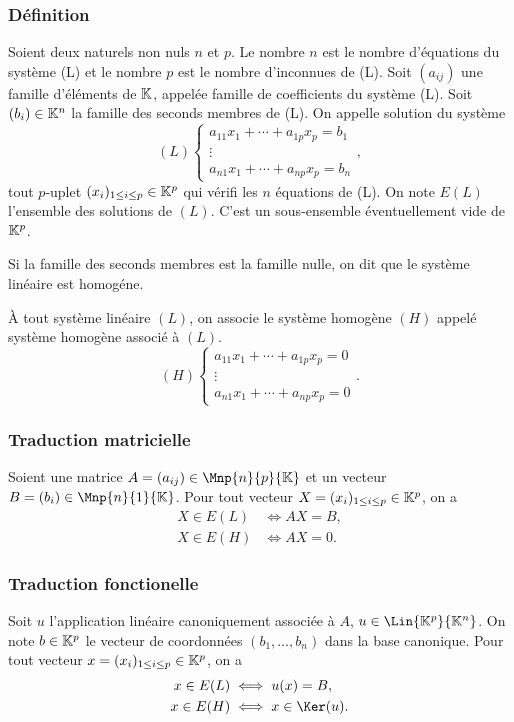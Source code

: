 \subsubsection{Définition}
\begin{defdef}
  Soient deux naturels non nuls $n$ et $p$. Le nombre $n$ est le nombre d'équations du système (L) et le nombre $p$ est le nombre d'inconnues de (L). Soit $(a_{ij})$ une famille d'éléments de $\mathbb{K}$, appelée famille de coefficients du système (L). Soit $(b_i) \in \mathbb{K}^n$ la famille des seconds membres de (L). On appelle solution du système
  \begin{equation}
    (L)
    \begin{cases}
      a_{11}x_1 + \dotsb +a_{1p}x_p = b_1 \\
      \vdots \\
      a_{n1}x_1 + \dotsb +a_{np}x_p = b_n
    \end{cases},
  \end{equation}
  tout $p$-uplet $(x_i)_{1\leq i\leq p} \in \mathbb{K}^p$ qui vérifi les $n$ équations de (L). On note $E(L)$ l'ensemble des solutions de $(L)$. C'est un sous-ensemble éventuellement vide de $\mathbb{K}^p$.
\end{defdef}
%
\begin{defdef}
  Si la famille des seconds membres est la famille nulle, on dit que le système linéaire est homogéne.
\end{defdef}
%
À tout système linéaire $(L)$, on associe le système homogène $(H)$ appelé système homogène associé à $(L)$.
\begin{equation}
  (H)
  \begin{cases}
    a_{11}x_1 + \dotsb +a_{1p}x_p = 0 \\
    \vdots \\
    a_{n1}x_1 + \dotsb +a_{np}x_p = 0
  \end{cases}.
\end{equation}
%
\subsubsection{Traduction matricielle}
Soient une matrice $A=(a_{ij}) \in \Mnp{n}{p}{\K}$ et un vecteur $B=(b_{i}) \in \Mnp{n}{1}{\K}$. Pour tout vecteur $X=(x_i)_{1\leq i \leq p} \in \mathbb{K}^p$, on a
\begin{align}
  X \in E(L) &\iff AX=B, \\
  X \in E(H) &\iff AX=0.
\end{align}
%
\subsubsection{Traduction fonctionelle}
Soit $u$ l'application linéaire canoniquement associée à $A$, $u \in \Lin{\K^p}{\K^n}$. On note $b \in \mathbb{K}^p$ le vecteur de coordonnées $(b_1, \ldots, b_n)$ dans la base canonique. Pour tout vecteur $x=(x_i)_{1\leq i \leq p} \in \mathbb{K}^p$, on a
\begin{align}
  x \in E(L) &\iff u(x)=B, \\
  x \in E(H) &\iff x\in\Ker(u).
\end{align}

